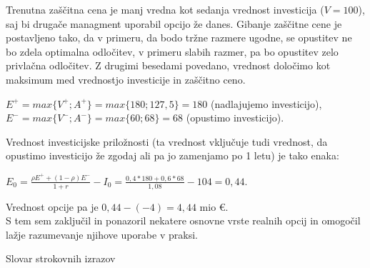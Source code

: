 Trenutna zaščitna cena je manj vredna kot sedanja vrednost investicija ($V = 100$), saj bi drugače managment uporabil opcijo že danes. Gibanje zaščitne cene je postavljeno tako, da v primeru, da bodo tržne razmere ugodne, se opustitev ne bo zdela optimalna odločitev, v primeru slabih razmer, pa bo opustitev zelo privlačna odločitev. Z drugimi besedami povedano, vrednost določimo kot maksimum med vrednostjo investicije in zaščitno ceno.
\begin{center}
$E^+ = max\{V^+; A^+\}= max\{180; 127,5\} = 180$ (nadlajujemo investicijo), \\[0,5 cm]
$E^- = max\{V^-; A^-\}= max\{60; 68\} = 68$ (opustimo investicijo). \\[0,5 cm]
\end{center}

Vrednost investicijske priložnosti (ta vrednost vključuje tudi vrednost, da opustimo investicijo že zgodaj ali pa jo zamenjamo po 1 letu) je tako enaka: \\[0,5 cm]
\begin{center}
$E_0 = \tfrac{\rho E^+ + (1-\rho)E^-}{1+r}-I_0 = \tfrac{0,4*180+0,6*68}{1,08} -104 = 0,44$. 
\end{center}

Vrednost opcije pa je $0,44-(-4)=4,44$ mio €. \\

S tem sem zaključil in ponazoril nekatere osnovne vrste realnih opcij in omogočil lažje razumevanje njihove uporabe v praksi.


\pagebreak
\begin{center}
\large{Slovar strokovnih izrazov}
\end{center}

